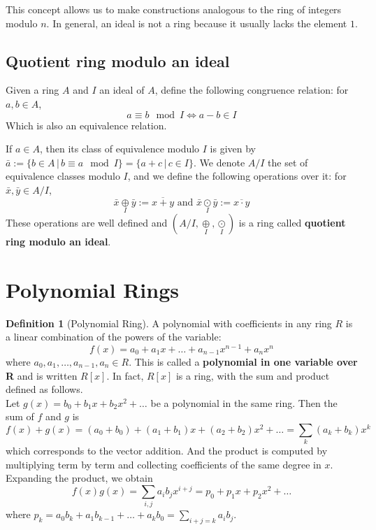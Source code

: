 \documentclass[12pt,a4paper]{article}
\theoremstyle{definition}
\newtheorem{definition}{Definition}[section]
\begin{document}
This concept allows us to make constructions analogous to the ring of integers modulo \(n\). In general, an ideal is not a ring because it usually lacks the element $1$.

\subsection{Quotient ring modulo an ideal}

Given a ring $A$ and $I$ an ideal of $A$, define the following congruence relation: for $a, b \in A$,
\[a \equiv b \mod I \iff a- b \in I  \]
Which is also an equivalence relation.

If $a \in A$, then its class of equivalence modulo $I$ is given by \(\bar{a} := \{ b \in A \, | \, b \equiv a \mod I \} = \{ a + c \, | \, c \in I \}\). We denote $A/I$ the set of equivalence classes modulo $I$, and we define the following operations over it: for $\bar{x}, \bar{y} \in A/I$, 
\[
\bar{x} \underset{I}{\oplus} \bar{y} := \overline{x+y} \text{ and } \bar{x} \underset{I}{\odot} \bar{y} := \overline{x\cdot y}
\]
These operations are well defined and $(A/I, \underset{I}{\oplus},  \underset{I}{\odot})$ is a ring called \textbf{quotient ring modulo an ideal}.

\section{Polynomial Rings}\label{polynomial-rings}

\begin{definition}[Polynomial Ring]
A polynomial with coefficients in any ring $R$ is a linear combination of the powers of the variable:
\[
f(x) = a_0 + a_1 x + \ldots + a_{n-1} x^{n-1} + a_n x^n
\]
where $a_0, a_1, \ldots, a_{n-1}, a_n \in R$. This is called a \textbf{polynomial in one variable over R} and is written $R[x]$. In fact, $R[x]$ is a ring, with the sum and product defined as follows. \\

Let $g(x) = b_0 + b_1 x + b_2 x^2 + \ldots$ be a polynomial in the same ring. Then the sum of $f$ and $g$ is 
\[
f(x) +  g(x) = (a_0 + b_0) + (a_1 + b_1)x + (a_2 + b_2)x^2 + \ldots = \sum_k (a_k + b_k)x^k
\]
which corresponds to the vector addition. And the product is computed by multiplying term by term and collecting coefficients of the same degree in $x$. Expanding the product, we obtain
\[
f(x)g(x) = \sum_{i,j} a_i b_j x^{i+j} = p_0 + p_1 x + p_2 x^2 + \ldots
\]
where $p_k = a_0 b_k + a_1 b_{k-1} + \ldots + a_k b_0 = \sum_{i+j=k} a_i b_j$.
\end{definition}
\end{document}
